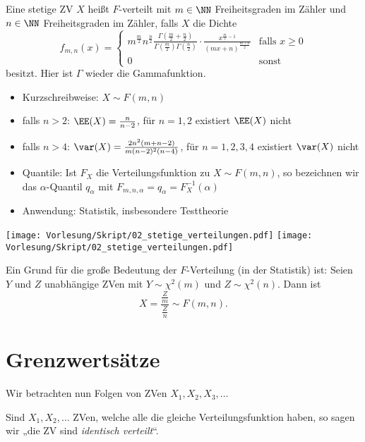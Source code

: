 \documentclass{scrreprt}
\begin{document}
 Eine stetige ZV $X$ heißt $F$-verteilt mit $m\in \NN$ Freiheitsgraden im Zähler und $n\in \NN$ Freiheitsgraden im Zähler, falls $X$ die Dichte
\[ f_{m,n}(x)=\begin{cases}
m^{\frac{m}{2}}n^{\frac{n}{2}}\frac{\Gamma\left(\frac{m}{2}+\frac{n}{2}\right)}{\Gamma\left(\frac{m}{2}\right)\Gamma\left(\frac{n}{2}\right)}\cdot \frac{x^{\frac{m}{2}-1}}{(mx+n)^{\frac{m+n}{2}}} & \text{falls }x\geq 0\\
0 & \text{sonst}
\end{cases} \] 
besitzt. Hier ist $\Gamma$ wieder die Gammafunktion.
\begin{itemize}
	\item Kurzschreibweise: $X\sim F(m,n)$
	\item falls $n>2$: $\EE(X)=\frac{n}{n-2}$, für $n=1,2$ existiert $\EE(X)$ nicht
	\item falls $n>4$: $\var(X)=\frac{2n^2(m+n-2)}{m(n-2)^2(n-4)}$, für $n=1,2,3,4$ existiert $\var(X)$ nicht
	\item Quantile: Ist $F_X$ die Verteilungsfunktion zu $X\sim F(m,n)$, so bezeichnen wir das $\alpha$-Quantil $q_\alpha$ mit $F_{m,n,\alpha}=q_\alpha=F_{X}^{-1}(\alpha)$
	\item Anwendung: Statistik, insbesondere Testtheorie
\end{itemize}

\begin{center}
\texttt{[image: Vorlesung/Skript/02\_stetige\_verteilungen.pdf]}
\texttt{[image: Vorlesung/Skript/02\_stetige\_verteilungen.pdf]}
\end{center}

Ein Grund für die große Bedeutung der $ F $-Verteilung (in der Statistik) ist:
 Seien $ Y $ und $ Z $ unabhängige ZVen mit $ Y\sim \chi^{2} (m) $ und $ Z \sim \chi^{2}(n) $. Dann ist 
\[ X=\frac{\frac{Z}{m}}{\frac{Z}{n}}\sim F(m,n) \text{.} \]
\section{Grenzwertsätze}

Wir betrachten nun Folgen von ZVen $X_1, X_2, X_3, \ldots$

 Sind $X_1, X_2, \ldots$ ZVen, welche alle die gleiche Verteilungsfunktion haben, so sagen wir „die ZV sind \emph{identisch verteilt}“.
\end{document}
